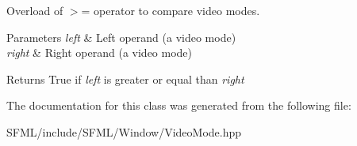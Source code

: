 Overload of $>$= operator to compare video modes. 


\begin{DoxyParams}{Parameters}
{\em left} & Left operand (a video mode) \\
\hline
{\em right} & Right operand (a video mode)\\
\hline
\end{DoxyParams}
\begin{DoxyReturn}{Returns}
True if {\itshape left} is greater or equal than {\itshape right} \begin{DoxyVerb}\end{DoxyVerb}
 
\end{DoxyReturn}


The documentation for this class was generated from the following file\+:\begin{DoxyCompactItemize}
\item 
S\+F\+M\+L/include/\+S\+F\+M\+L/\+Window/Video\+Mode.\+hpp\end{DoxyCompactItemize}
